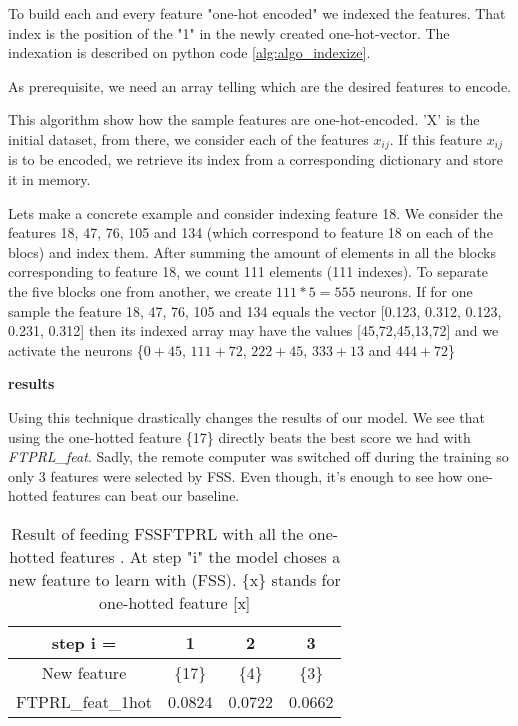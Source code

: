 		To build each and every feature "one-hot encoded" we indexed the features. That index is the position of the "1" in the newly created one-hot-vector. The indexation is described on python code \ref{alg:algo_indexize}.

		\begin{algorithm}[H]
			As prerequisite, we need an array telling which are the desired features to encode. \\
			\caption{This algorithm show how the sample features are one-hot-encoded. 'X' is the initial dataset, from there, we consider each of the features $x_{ij}$. If this feature $x_{ij}$ is to be encoded, we retrieve its index from a corresponding dictionary and store it in memory. }
			\label{alg:algo_indexize}
		\end{algorithm}

		Lets make a concrete example and consider indexing feature 18. We consider the features 18, 47, 76, 105 and 134 (which correspond to feature 18 on each of the blocs) and index them. After summing the amount of elements in all the blocks corresponding to feature 18, we count 111 elements (111 indexes). To separate the five blocks one from another, we create $111*5 = 555$ neurons. If for one sample the feature 18, 47, 76, 105 and 134 equals the vector [0.123, 0.312, 0.123, 0.231, 0.312] then its indexed array may have the values [45,72,45,13,72] and we activate the neurons \{$0+45$, $111+72$, $222+45$, $333+13$ and $444+72$\}

		\vspace{\baselineskip}
		\textbf{results}
		
		Using this technique drastically changes the results  of our model. We see that using the one-hotted feature \{17\} directly beats the best score we had with \textit{FTPRL\_feat}. Sadly, the remote computer was switched off during the training so only 3 features were selected by FSS. Even though, it's enough to see how one-hotted features can beat our baseline.

		\begin{table}
			\centering
			\begin{tabular}{c|c|c|c}
				step i = & 1 & 2 & 3 \\
				\hline
				New feature 		& \{17\} & \{4\} & \{3\}    \\
				FTPRL\_feat\_1hot	&  0.0824 & 0.0722 & 0.0662 \\
			\end{tabular}
			\caption{Result of feeding FSSFTPRL with all the one-hotted features . At step "i" the model choses a new feature to learn with (FSS). \{x\} stands for one-hotted feature [x]  }
			\label{tab:FTPRL_feat_1hot}
		\end{table}



